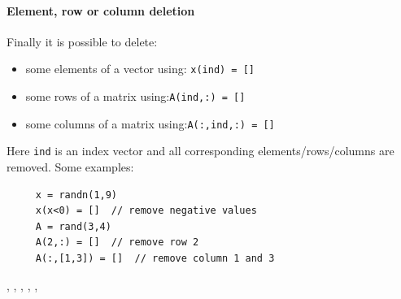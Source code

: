 \paragraph{Element, row or column deletion}

Finally it is possible to delete:
\begin{itemize}
\item some elements of a vector using: \verb+x(ind) = []+
\item some rows of a matrix using:\verb+A(ind,:) = []+  
\item some columns of a matrix using:\verb+A(:,ind,:) = []+ 
\end{itemize}
Here \verb+ind+ is an index vector and all corresponding elements/rows/columns are removed.
Some examples:
\begin{Verbatim}
     x = randn(1,9)
     x(x<0) = []  // remove negative values
     A = rand(3,4)
     A(2,:) = []  // remove row 2
     A(:,[1,3]) = []  // remove column 1 and 3
\end{Verbatim}




\begin{manseealso}
    , , , , , 
\end{manseealso}
